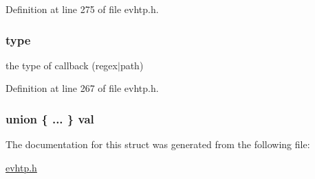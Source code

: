 Definition at line 275 of file evhtp.h.

\hypertarget{structevhtp__callback__s_a6da94264a51bd354aca3d22098a2aee5}{
\subsubsection[{type}]{ {\bf type}}}
\label{structevhtp__callback__s_a6da94264a51bd354aca3d22098a2aee5}
the type of callback (regex$|$path) 

Definition at line 267 of file evhtp.h.

\hypertarget{structevhtp__callback__s_a46fe687f5d6aa04ca3260318f08188b4}{
\subsubsection[{val}]{\setlength{\rightskip}{0pt plus 5cm}union \{ ... \}   {\bf val}}}
\label{structevhtp__callback__s_a46fe687f5d6aa04ca3260318f08188b4}


The documentation for this struct was generated from the following file:\begin{DoxyCompactItemize}
\item 
\hyperlink{evhtp_8h}{evhtp.h}\end{DoxyCompactItemize}
